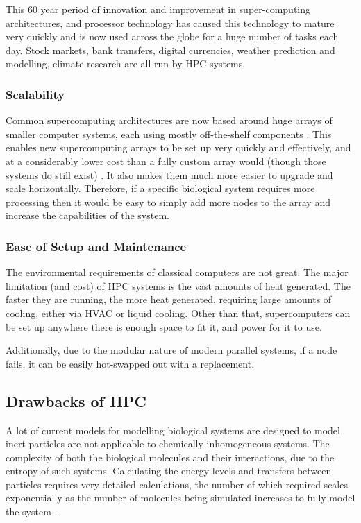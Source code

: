 This 60 year period of innovation and improvement in super-computing architectures, and processor technology has caused this technology to mature very quickly and is now used across the globe for a huge number of tasks each day. Stock markets, bank transfers, digital currencies, weather prediction and modelling, climate research are all run by HPC systems.

{}
\subsubsection*{Scalability}
Common supercomputing architectures are now based around huge arrays of smaller computer systems, each using mostly off-the-shelf components \cite{sciences1989supercomputers}. This enables new supercomputing arrays to be set up very quickly and effectively, and at a considerably lower cost than a fully custom array would (though those systems do still exist) . It also makes them much more easier to upgrade and scale horizontally. Therefore, if a specific biological system requires more processing then it would be easy to simply add more nodes to the array and increase the capabilities of the system.

{}
\subsubsection*{Ease of Setup and Maintenance}
The environmental requirements of classical computers are not great. The major limitation (and cost) of HPC systems is the vast amounts of heat generated. The faster they are running, the more heat generated, requiring large amounts of cooling, either via HVAC or liquid cooling. Other than that, supercomputers can be set up anywhere there is enough space to fit it, and power for it to use.

Additionally, due to the modular nature of modern parallel systems, if a node fails, it can be easily hot-swapped out with a replacement.

{}
\subsection*{Drawbacks of HPC}
A lot of current models for modelling biological systems are designed to model inert particles are not applicable to chemically inhomogeneous systems. The complexity of both the biological molecules and their interactions, due to the entropy of such systems. Calculating the energy levels and transfers between particles requires very detailed calculations, the number of which required scales exponentially as the number of molecules being simulated increases to fully model the system \cite{Quantum-assisted}.

